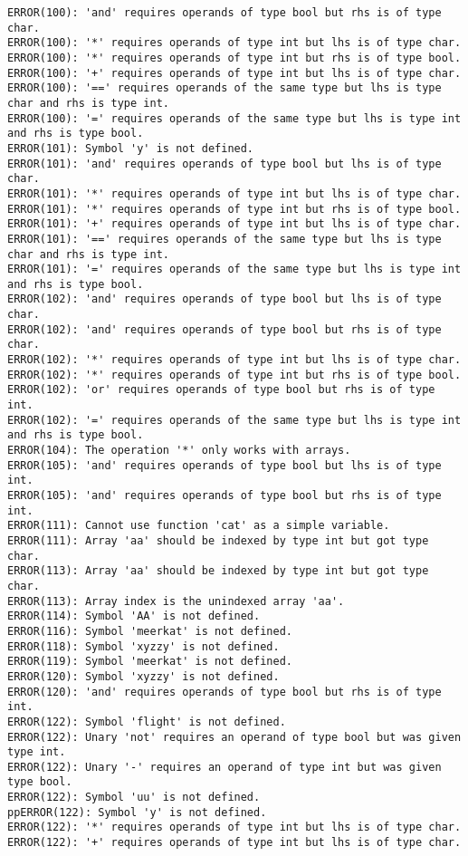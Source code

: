 \documentclass[12pt]{book}
\begin{document}
\begin{lstlisting}
ERROR(100): 'and' requires operands of type bool but rhs is of type char.
ERROR(100): '*' requires operands of type int but lhs is of type char.
ERROR(100): '*' requires operands of type int but rhs is of type bool.
ERROR(100): '+' requires operands of type int but lhs is of type char.
ERROR(100): '==' requires operands of the same type but lhs is type char and rhs is type int.
ERROR(100): '=' requires operands of the same type but lhs is type int and rhs is type bool.
ERROR(101): Symbol 'y' is not defined.
ERROR(101): 'and' requires operands of type bool but lhs is of type char.
ERROR(101): '*' requires operands of type int but lhs is of type char.
ERROR(101): '*' requires operands of type int but rhs is of type bool.
ERROR(101): '+' requires operands of type int but lhs is of type char.
ERROR(101): '==' requires operands of the same type but lhs is type char and rhs is type int.
ERROR(101): '=' requires operands of the same type but lhs is type int and rhs is type bool.
ERROR(102): 'and' requires operands of type bool but lhs is of type char.
ERROR(102): 'and' requires operands of type bool but rhs is of type char.
ERROR(102): '*' requires operands of type int but lhs is of type char.
ERROR(102): '*' requires operands of type int but rhs is of type bool.
ERROR(102): 'or' requires operands of type bool but rhs is of type int.
ERROR(102): '=' requires operands of the same type but lhs is type int and rhs is type bool.
ERROR(104): The operation '*' only works with arrays.
ERROR(105): 'and' requires operands of type bool but lhs is of type int.
ERROR(105): 'and' requires operands of type bool but rhs is of type int.
ERROR(111): Cannot use function 'cat' as a simple variable.
ERROR(111): Array 'aa' should be indexed by type int but got type char.
ERROR(113): Array 'aa' should be indexed by type int but got type char.
ERROR(113): Array index is the unindexed array 'aa'.
ERROR(114): Symbol 'AA' is not defined.
ERROR(116): Symbol 'meerkat' is not defined.
ERROR(118): Symbol 'xyzzy' is not defined.
ERROR(119): Symbol 'meerkat' is not defined.
ERROR(120): Symbol 'xyzzy' is not defined.
ERROR(120): 'and' requires operands of type bool but rhs is of type int.
ERROR(122): Symbol 'flight' is not defined.
ERROR(122): Unary 'not' requires an operand of type bool but was given type int.
ERROR(122): Unary '-' requires an operand of type int but was given type bool.
ERROR(122): Symbol 'uu' is not defined.
ppERROR(122): Symbol 'y' is not defined.
ERROR(122): '*' requires operands of type int but lhs is of type char.
ERROR(122): '+' requires operands of type int but lhs is of type char.

\end{lstlisting}
\end{document}
